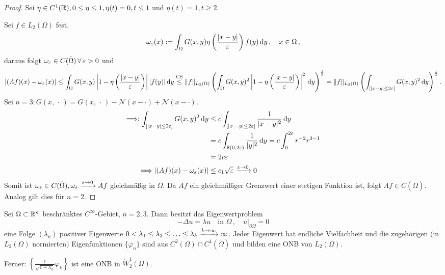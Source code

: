 \begin{proof}
Sei $\eta \in C^1 (\mathbb{R}), 0 \leq \eta \leq 1, \eta(t) = 0, t \leq 1$ und $\eta(t) = 1 , t \geq 2$.

Sei $f \in L_2(\Omega)$ fest,
\[
	\omega_\varepsilon (x) := \int_\Omega G(x,y) \eta \left(\frac{\lvert x-y\rvert}{\varepsilon}\right) f(y) \,\mathrm{d} y \, , \quad x \in \Omega \, ,
\]
daraus folgt $\omega_\varepsilon \in C(\bar\Omega) \, \forall \, \varepsilon >0$ und
\begin{dmath*}
\abs{(Af)(x) - \omega_\epsilon(x)} \leq \int_\Omega G(x,y) \Abs{1-\eta\left(\frac{\abs{x-y}}\epsilon\right)} \abs{f(y)} \d y  \\
\stackrel{\scriptsize\text{CS}}\leq \norm f_{L_2(\Omega)} \left(\int_\Omega G(x,y)^2 \Abs{1-\eta\left(\frac{\abs{x-y}}\epsilon\right)}^2 \d y \right)^{\frac 1 2} 
= \norm f_{L_2(\Omega)} \left( \int_{[\abs{x-y}\leq 2 \epsilon]} G(x,y)^2 \d y \right)^{\frac 1 2} .
\end{dmath*}
Sei $n = 3: G(x,\, \cdot \,) = G(x,\, \cdot \, ) - \mathcal N(x-\cdot) + \mathcal N(x-\cdot)$.
\begin{align*}
	\Longrightarrow: \int_{[\lvert x-y\rvert \leq 2\varepsilon]} G(x,y)^2 \,\mathrm{d} y & \leq c \int_{[\lvert x-.y\rvert \leq 2 \varepsilon]} \frac 1{\lvert x-y\rvert^2} \,\mathrm{d} y \\
	& = c \int_{\mathbb{B}(0,2\varepsilon)} \frac 1{\lvert y\rvert^2} \,\mathrm{d} y = c \int_0^{2\varepsilon}  r^{-2} r^{3-1} \\
	& = 2c\varepsilon \\
	\Longrightarrow \lvert (Af)(x) - \omega_\varepsilon (x)\rvert & \leq c_1 \sqrt {\varepsilon} \xrightarrow{\varepsilon \rightarrow 0} 0
\end{align*}
Somit ist $\omega_\varepsilon \in C(\bar\Omega), \omega_\varepsilon \xrightarrow{\varepsilon\rightarrow 0} Af$ gleichmäßig in $\bar\Omega$. Da $Af$ ein gleichmäßiger Grenzwert einer stetigen Funktion ist, folgt
$Af\in C(\bar\Omega)$. Analog gilt dies für $n=2$.
\end{proof}

\begin{theorem} 
\label{theorem:7.37}
Sei $\Omega \subset \mathbb{R}^n$ beschränktes $C^\infty$-Gebiet, $n = 2, 3$. Dann besitzt das Eigenwertproblem
\[
	- \Delta u = \lambda u \quad\text{in } \Omega \, , \quad u|_{\partial \Omega} = 0 
\]
eine Folge $(\lambda_k)$ positiver Eigenwerte $0 < \lambda_1 \leq \lambda_2 \leq \ldots\leq \lambda_k\xrightarrow{k\rightarrow\infty} \infty$. Jeder Eigenwert hat endliche Vielfachheit und die zugehörigen $($in $L_2(\Omega)$ normierten$)$ Eigenfunktionen $\{\varphi_n\}$ sind aus $C^2(\Omega)\cap C^1(\bar\Omega)$ und bilden eine ONB von $L_2(\Omega)$.

Ferner: $\left\{\frac 1{\sqrt{1+\lambda_k}} \varphi_k\right\}$ ist eine ONB in $\mathring W^1_2(\Omega)$.
\end{theorem}

